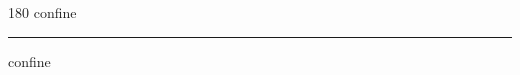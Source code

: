 
\begin{frame}
\begin{center}
\begin{turn}{180}
{\fontsize{2.5cm}{1em}\selectfont confine}
\end{turn}
\vspace{1em}\par  
\hrule
\vspace{1em}\par  
{\fontsize{2.5cm}{1em}\selectfont confine}
\end{center}
\end{frame}
